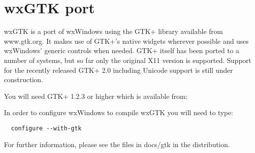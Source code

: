 \section{wxGTK port}\label{wxgtkport}

wxGTK is a port of wxWindows using the GTK+ library available
from www.gtk.org. It makes use of GTK+'s native widgets wherever
possible and uses wxWindows' generic controls when needed. GTK+
itself has been ported to a number of systems, but so far only the
original X11 version is supported. Support for the recently released
GTK+ 2.0 including Unicode support is still under construction.

You will need GTK+ 1.2.3 or higher which is available from:


In order to configure wxWindows to compile wxGTK you will 
need to type:

\begin{verbatim}
  configure --with-gtk
\end{verbatim}

For further information, please see the files in docs/gtk
in the distribution.

